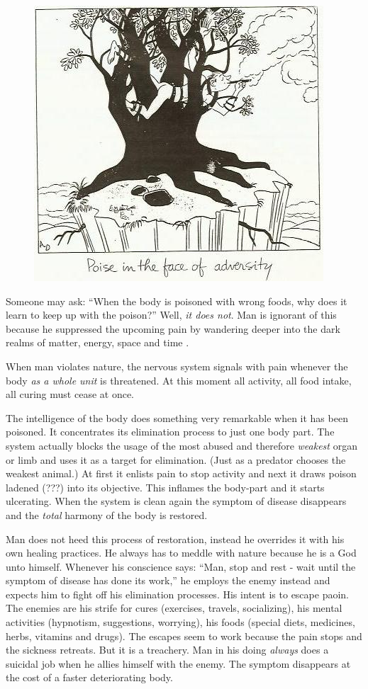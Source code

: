 \documentclass[landscape,twocolumn,letterpaper]{article}
\newcommand{\mest}{matter, energy, space and time }
\begin{document}
\begin{figure} \centering
  \includegraphics[height=0.4\textheight,bb= 0 0 408 389]{p21.jpg}
\end{figure}



Someone may ask: ``When the body is poisoned with wrong foods, why
does it learn to keep up with the poison?'' Well, \emph{it does
not}. Man is ignorant of this because he suppressed the upcoming pain
by wandering deeper into the dark realms of \mest.

When man violates nature, the nervous system signals with pain
whenever the body \emph{as a whole unit} is threatened. At this moment
all activity, all food intake, all curing must cease at once.

The intelligence of the body does something very remarkable when it
has been poisoned. It concentrates its elimination process to just one
body part. The system actually blocks the usage of the most abused and
therefore \emph{weakest} organ or limb and uses it as a target for
elimination. (Just as a predator chooses the weakest animal.) At first
it enlists pain to stop activity and next it draws poison ladened
(???) into its objective. This inflames the body-part and it starts
ulcerating. When the system is clean again the symptom of disease
disappears and the \emph{total} harmony of the body is restored.

Man does not heed this process of restoration, instead he overrides it
with his own healing practices. He always has to meddle with nature
because he is a God unto himself. Whenever his conscience says: ``Man,
stop and rest - wait until the symptom of disease has done its work,''
he employs the enemy instead and expects him to fight off his
elimination processes. His intent is to escape paoin. The enemies are
his strife for cures (exercises, travels, socializing), his mental
activities (hypnotism, suggestions, worrying), his foods (special
diets, medicines, herbs, vitamins and drugs). The escapes seem to work
because the pain stops and the sickness retreats. But it is a
treachery. Man in his doing \emph{always} does a suicidal job when he
allies himself with the enemy. The symptom disappears at the cost of a
faster deteriorating body.
\end{document}
